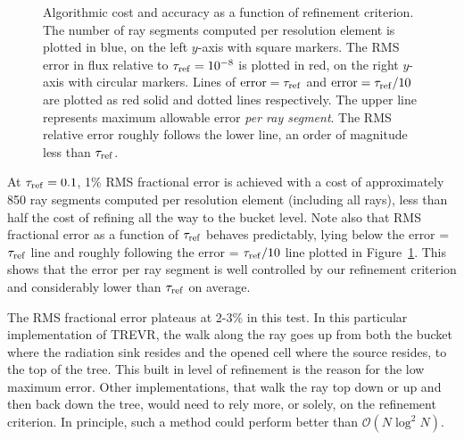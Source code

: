 \documentclass[fleq,usenatbib]{mnras}
\newcommand{\acro}{TREVR}
\newcommand{\bigO}[1]{\mathcal{O}\left(#1\right)}
\newcommand{\tr}{\tau_{\rm ref}}
\begin{document}
{\begin{figure}
\caption{Algorithmic cost and accuracy as a function of refinement criterion. 
The number of ray segments computed per resolution element is plotted in blue, 
on the left $y$-axis with square markers. The RMS error in flux relative to 
$\tr=10^{-8}$ is plotted in red, on the right $y$-axis with circular markers. 
Lines of ${\rm error} = \tr$ and ${\rm error} = \tr/10$ are plotted as red 
solid and dotted lines respectively. The upper line represents maximum 
allowable error \textit{per ray segment}. The RMS relative error roughly 
follows the lower line, an order of magnitude less than $\tr$.}
\label{fig:refcrit}
\end{figure}

At $\tr=0.1$, 1\% RMS fractional error is achieved with a cost of 
approximately 850 ray segments computed per resolution element (including all 
rays), less than half the cost of refining all the way to the bucket level. 
Note also that RMS fractional error as a function of $\tr$ behaves 
predictably, lying below the error = $\tr$ line and roughly following the 
error = $\tr/10$ line plotted in Figure~\ref{fig:refcrit}. This shows that the 
error per ray segment is well controlled by our refinement criterion and 
considerably lower than $\tr$ on average.

The RMS fractional error plateaus at 2-3\% in this test. In this particular 
implementation of \acro{}, the walk along the ray goes up from both the bucket 
where the radiation sink resides and the opened cell where the source resides, 
to the top of the tree. This built in level of refinement is the reason for 
the low maximum error. Other implementations, that walk the ray top down or up 
and then back down the tree, would need to rely more, or solely, on the 
refinement criterion. In principle, such a method could perform better than 
$\bigO{N\log^2 N}$.

}
\end{document}

